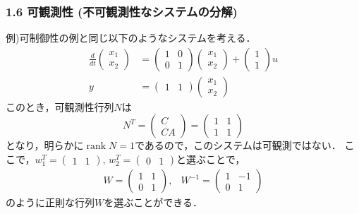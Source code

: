 \documentclass[10pt]{beamer}
\begin{document}
\begin{frame}[t]
\frametitle{1.6 可観測性 (不可観測性なシステムの分解)}
例)可制御性の例と同じ以下のようなシステムを考える．
\begin{align}
 \frac{d}{dt}
  \left(
   \begin{array}{c}
    x_1 \\
    x_2
   \end{array}
  \right) &=
  \left(
   \begin{array}{cc}
    1 & 0 \\
    0 & 1
   \end{array}
  \right)
  \left(
   \begin{array}{c}
    x_1 \\
    x_2
   \end{array}
  \right) +
  \left(
   \begin{array}{c}
    1 \\
    1
   \end{array}
  \right) u \\
 y &=
  \left(
   \begin{array}{cc}
    1 & 1
   \end{array}
  \right)
  \left(
   \begin{array}{c}
    x_1 \\
    x_2
   \end{array}
  \right)
\end{align}
このとき，可観測性行列$N$は
\begin{equation}
 N^T =
  \left(
   \begin{array}{c}
    C \\
    CA
   \end{array}
  \right) =
  \left(
   \begin{array}{cc}
    1 & 1 \\
    1 & 1
   \end{array}
  \right)
\end{equation}
となり，明らかに$\operatorname{rank} N = 1$であるので，このシステムは可観測ではない．
ここで，$w_1^T = (\begin{array}{cc}1 & 1\end{array})$,
$w_2^T = (\begin{array}{cc}0 & 1\end{array})$と選ぶことで，
\begin{equation}
 \begin{array}{cc}
  W =
   \left(
    \begin{array}{cc}
     1 & 1 \\
     0 & 1
    \end{array}
   \right),
   &
  W^{-1} =
   \left(
    \begin{array}{cc}
     1 & -1 \\
     0 & 1
    \end{array}
   \right)
 \end{array}
\end{equation}
のように正則な行列$W$を選ぶことができる．
\end{frame}
\end{document}

